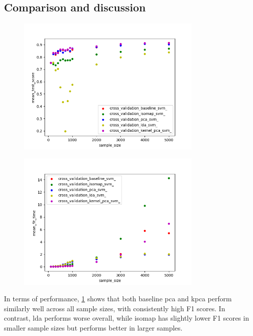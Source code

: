 \subsection{Comparison and discussion}

\begin{figure}[htb!]
    \centering
    \includegraphics[width=0.8\textwidth]{figures/test_score_based_on_size.png}
    \caption{}
    \label{fig:experiment_4_performance_size}
\end{figure}


\begin{figure}[htb!]
    \centering
    \includegraphics[width=0.8\textwidth]{figures/time_based_on_size.png}
    \caption{}
    \label{fig:experiment_4_speed_size}
\end{figure}


In terms of performance, \ref{fig:experiment_4_performance_size} shows that both baseline \gls{pca} and \gls{kpca} perform similarly well across all sample sizes, with consistently high F1 scores. In contrast, \gls{lda} performs worse overall, while \gls{isomap} has slightly lower F1 scores in smaller sample sizes but performs better in larger samples.

